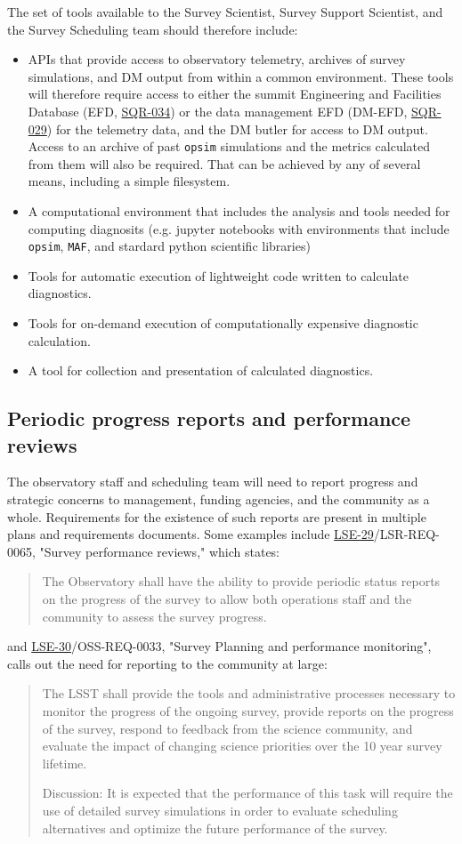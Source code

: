 The set of tools available to the Survey Scientist, Survey Support Scientist, and the Survey Scheduling team should therefore include:
\begin{itemize}
\item APIs that provide access to observatory telemetry, archives of survey simulations, and DM output from within a common environment. These tools will therefore require access to either the summit Engineering and Facilities Database (EFD, \href{https://ls.st/sql-034}{SQR-034}) or the data management EFD (DM-EFD, \href{https://ls.st/sqr-029}{SQR-029}) for the telemetry data, and the DM butler for access to DM output. Access to an archive of past \texttt{opsim} simulations and the metrics calculated from them will also be required. That can be achieved by any of several means, including a simple filesystem.
\item A computational environment that includes the analysis and tools needed for computing diagnosits (e.g. jupyter notebooks with environments that include \texttt{opsim}, \texttt{MAF}, and stardard python scientific libraries)
\item Tools for automatic execution of lightweight code written to calculate diagnostics.
\item Tools for on-demand execution of computationally expensive diagnostic calculation.
\item A tool for collection and presentation of calculated diagnostics.
\end{itemize}

\subsection{Periodic progress reports and performance reviews}
\label{sec:org8cc1cd9}
The observatory staff and scheduling team will need to report progress and strategic concerns to management, funding agencies, and the community as a whole. Requirements for the existence of such reports are present in multiple plans and requirements documents. Some examples include \href{https://ls.st/lse-29}{LSE-29}/LSR-REQ-0065, "Survey performance reviews," which states:
\begin{quote}
The Observatory shall have the ability to provide periodic status reports on the progress of the survey to allow both operations staff and the community to assess the survey progress.
\end{quote}
and \href{https://ls.st/lse-30}{LSE-30}/OSS-REQ-0033, "Survey Planning and performance monitoring", calls out the need for reporting to the community at large:
\begin{quote}
The LSST shall provide the tools and administrative processes necessary to monitor the progress of the ongoing survey, provide reports on the progress of the survey, respond to feedback from the science community, and evaluate the impact of changing science priorities over the 10 year survey lifetime.

Discussion: It is expected that the performance of this task will require the use of detailed survey simulations in order to evaluate scheduling alternatives and optimize the future performance of the survey.
\end{quote}

